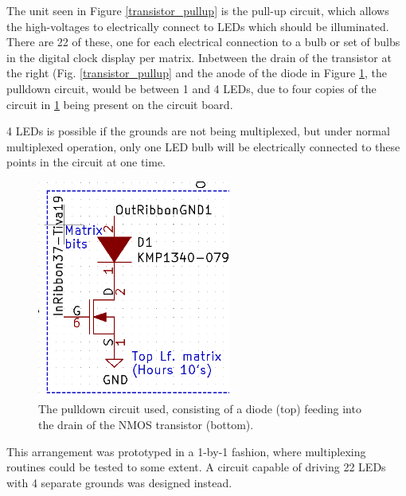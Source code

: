 \documentclass[11pt]{article}
\begin{document}
The unit seen in Figure \ref{transistor_pullup} is the pull-up circuit, which allows the high-voltages to electrically connect to LEDs which should be illuminated. 
There are 22 of these, one for each electrical connection to a bulb or set of bulbs in the digital clock display per matrix. 
Inbetween the drain of the transistor at the right (Fig. \ref{transistor_pullup} and the anode of the diode in Figure \ref{transistor_pulldown}, the pulldown circuit, would be between 1 and 4 LEDs, due to four copies of the circuit in \ref{transistor_pulldown} being present on the circuit board. 
\pagebreak

4 LEDs is possible if the grounds are not being multiplexed, but under normal multiplexed operation, only one LED bulb will be electrically connected to these points in the circuit at one time.

\begin{figure}[H]
\centering
\includegraphics[width=2.5in]{basic_transistor_unit_down.png}
\caption{The pulldown circuit used, consisting of a diode (top) feeding into the drain of the NMOS transistor (bottom).}
\label{transistor_pulldown}
\end{figure}


This arrangement was prototyped in a 1-by-1 fashion, where multiplexing routines could be tested to some extent. 
A circuit capable of driving 22 LEDs with 4 separate grounds was designed instead. 
\end{document}
